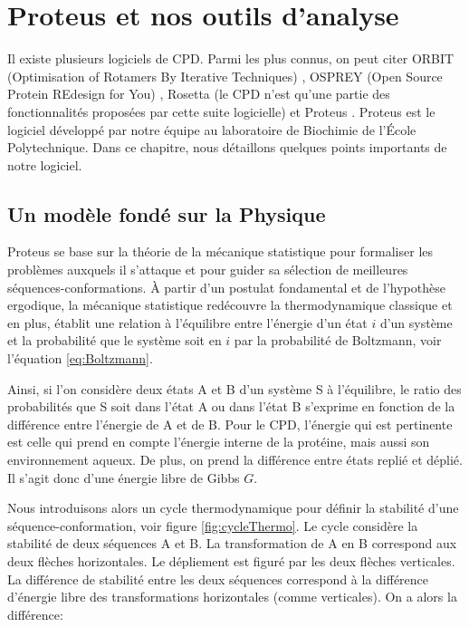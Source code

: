 \chapter{Proteus et nos outils d'analyse}
\label{chap:methodes}

Il existe plusieurs logiciels de CPD. Parmi les plus connus, on peut citer ORBIT (Optimisation of Rotamers By Iterative Techniques) \cite{Dahiyat96}, OSPREY (Open Source Protein REdesign for You) \cite{Gainza13}, Rosetta (le CPD n'est qu'une partie des fonctionnalités proposées par cette suite logicielle) \cite{Kuhlman03} et Proteus \cite{Simonson13,Polydorides16}. Proteus est le logiciel développé par notre équipe au laboratoire de Biochimie de l'École Polytechnique. Dans ce chapitre, nous détaillons quelques points importants de notre logiciel.  

\section{Un modèle fondé sur la Physique}
\label{sec:Phy}
Proteus se base sur la théorie de la mécanique statistique pour formaliser les problèmes auxquels il s'attaque et pour guider sa sélection de meilleures séquences-conformations. À partir d'un postulat fondamental et de l'hypothèse ergodique, la mécanique statistique \og redécouvre \fg la thermodynamique classique et en plus, établit une relation à l'équilibre entre l'énergie d'un état $i$ d'un système et la probabilité que le système soit en $i$ par la probabilité de Boltzmann, voir l'équation \vref{eq:Boltzmann}.

Ainsi, si l'on considère deux états A et B d'un système S à l'équilibre, le ratio des probabilités que S soit dans l'état A ou dans l'état B s'exprime en fonction de la différence entre l'énergie de A et de B. Pour le CPD, l'énergie qui est pertinente est celle qui prend en compte l'énergie interne de la protéine, mais aussi son environnement aqueux.  De plus, on prend la différence entre états replié et déplié. Il s'agit donc d'une énergie libre de Gibbs $G$.

Nous introduisons alors un cycle thermodynamique pour définir la stabilité d'une séquence-conformation, voir figure \ref{fig:cycleThermo}. Le cycle considère la stabilité de deux séquences A et B. La transformation de A en B correspond aux deux flèches horizontales. Le dépliement est figuré par les deux flèches verticales. La différence de stabilité entre les deux séquences correspond à la différence d'énergie libre des transformations horizontales (comme verticales). On a alors la différence: 


